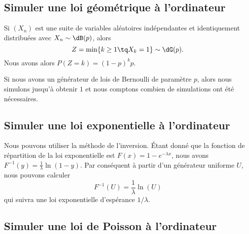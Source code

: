\subsection{Simuler une loi géométrique à l'ordinateur}

Si \( (X_n)\) est une suite de variables aléatoires indépendantes et identiquement distribuées avec \( X_n\sim \dB(p)\), alors
\begin{equation}
	Z=\min\{ k\geq 1\tq X_k=1 \}\sim\dG(p).
\end{equation}
Nous avons alors \( P(Z=k)=(1-p)^kp\).

Si nous avons un générateur de lois de Bernoulli de paramètre \( p\), alors nous simulons jusqu'à obtenir \( 1\) et nous comptons combien de simulations ont été nécessaires.

\subsection{Simuler une loi exponentielle à l'ordinateur}

Nous pouvons utiliser la méthode de l'inversion. Étant donné que la fonction de répartition de la loi exponentielle est \( F(x)=1- e^{-\lambda x}\), nous avons \( F^{-1}(y)=\frac{1}{ \lambda }\ln(1-y)\). Par conséquent à partir d'un générateur uniforme \( U\), nous pouvons calculer
\begin{equation}
	F^{-1}(U)=\frac{1}{ \lambda }\ln(U)
\end{equation}
qui suivra une loi exponentielle d'espérance \( 1/\lambda\).

\subsection{Simuler une loi de Poisson à l'ordinateur}

